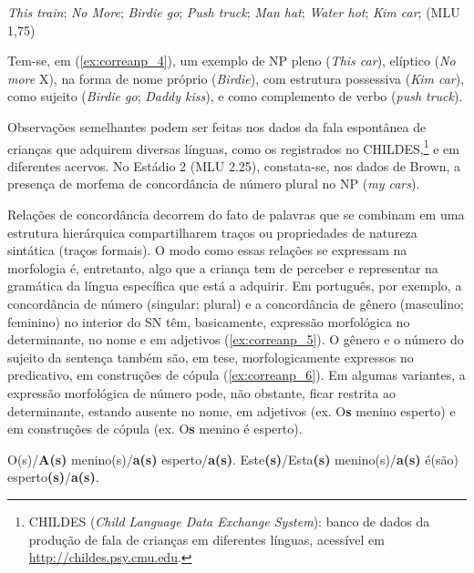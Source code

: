 \documentclass[output=paper]{LSP/langsci}
\begin{document}
\ea\label{ex:correanp_4}
\textit{This train}; \textit{No More};  \textit{Birdie go}; \textit{Push truck}; \textit{Man hat}; \textit{Water hot}; \textit{Kim car}; (MLU 1,75)
\z

Tem-se, em (\ref{ex:correanp_4}), um exemplo de NP pleno (\textit{This car}), elíptico (\textit{No more} X), na forma de nome próprio (\textit{Birdie}),  com estrutura possessiva (\textit{Kim car}), como sujeito (\textit{Birdie go}; \textit{Daddy kiss}), e como complemento de verbo (\textit{push truck}). 

Observações semelhantes podem ser feitas nos dados da fala espontânea de crianças que adquirem diversas línguas, como os registrados no CHILDES,\footnote{CHILDES (\textit{Child Language Data Exchange System}): banco de dados da produção de fala de crianças em diferentes línguas, acessível em \url{http://childes.psy.cmu.edu}.} e em diferentes acervos. No Estádio 2 (MLU 2.25), constata-se, nos dados de Brown, a presença de morfema de concordância de número plural no NP (\textit{my cars}). 

Relações de concordância decorrem do fato de palavras que se combinam em uma estrutura hierárquica compartilharem traços ou propriedades de natureza sintática (traços formais). O modo como essas relações se expressam na morfologia é, entretanto, algo que a criança tem de perceber e representar na gramática da língua específica que está a adquirir. Em português, por exemplo, a concordância de número (singular; plural) e a concordância de gênero (masculino; feminino) no interior do SN têm, basicamente, expressão morfológica no determinante, no nome e em adjetivos (\ref{ex:correanp_5}). O gênero e o número do sujeito da sentença também são, em tese, morfologicamente expressos no predicativo, em construções de cópula (\ref{ex:correanp_6}). Em algumas variantes, a expressão morfológica de número pode, não obstante, ficar restrita ao determinante, estando ausente no nome, em adjetivos (ex. O\textbf{s} menino esperto) e em construções de cópula (ex. O\textbf{s} menino é esperto). 

\ea\label{ex:correanp_5}
O(s)/\textbf{A(s)} menino(s)/\textbf{a(s)} esperto/\textbf{a(s)}. 
\z
\ea\label{ex:correanp_6}
Este\textbf{(s)}/Esta\textbf{(s)} menino(s)/\textbf{a(s)} é(são) esperto\textbf{(s)}/\textbf{a(s)}.
\z
\end{document}

